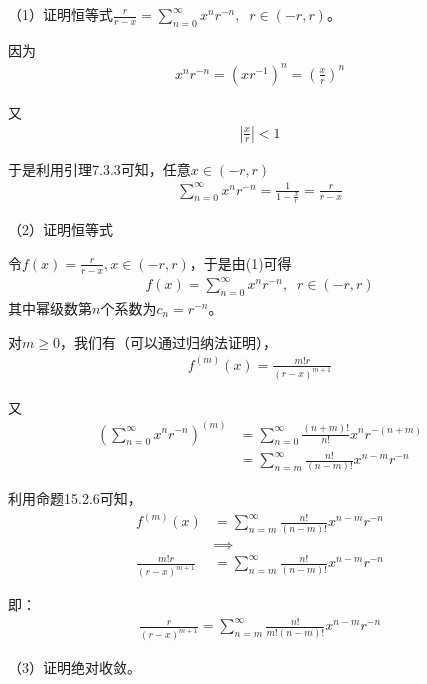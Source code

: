 \documentclass{article}
\begin{document}
（1）证明恒等式$\frac{r}{r - x} = \sum\limits_{n = 0}^\infty x^nr^{-n}, \;\; r \in (-r, r)$。

因为
\begin{align*}
  x^nr^{-n} = (xr^{-1})^n = (\frac{x}{r})^n
\end{align*}

又
\begin{align*}
  |\frac{x}{r}| < 1
\end{align*}

于是利用引理7.3.3可知，任意$x \in (-r, r)$
\begin{align*}
  \sum\limits_{n = 0}^\infty x^nr^{-n} = \frac{1}{1 - \frac{x}{r}} = \frac{r}{r - x}
\end{align*}

（2）证明恒等式

令$f(x) = \frac{r}{r - x}, x \in (-r, r)$，于是由(1)可得
\begin{align*}
  f(x) = \sum\limits_{n = 0}^\infty x^nr^{-n}, \;\; r \in (-r, r)
\end{align*}
其中幂级数第$n$个系数为$c_n = r^{-n}$。

对$m \geq 0$，我们有（可以通过归纳法证明），
\begin{align*}
  f^{(m)}(x) = \frac{m!r}{(r - x)^{m + 1}}
\end{align*}

又
\begin{align*}
  (\sum\limits_{n = 0}^\infty x^nr^{-n})^{(m)}
   & = \sum\limits_{n = 0}^\infty \frac{(n + m)!}{n!}x^nr^{-(n + m)} \\
   & = \sum\limits_{n = m}^\infty \frac{n!}{(n - m)!}x^{n - m}r^{-n}
\end{align*}

利用命题15.2.6可知，
\begin{align*}
  f^{(m)}(x)                  & = \sum\limits_{n = m}^\infty \frac{n!}{(n - m)!}x^{n - m}r^{-n} \\
                              & \implies                                                        \\
  \frac{m!r}{(r - x)^{m + 1}} & = \sum\limits_{n = m}^\infty \frac{n!}{(n - m)!}x^{n - m}r^{-n}
\end{align*}

即：
\begin{align*}
  \frac{r}{(r - x)^{m + 1}} = \sum\limits_{n = m}^\infty \frac{n!}{m!(n - m)!}x^{n - m}r^{-n}
\end{align*}

（3）证明绝对收敛。
\end{document}
